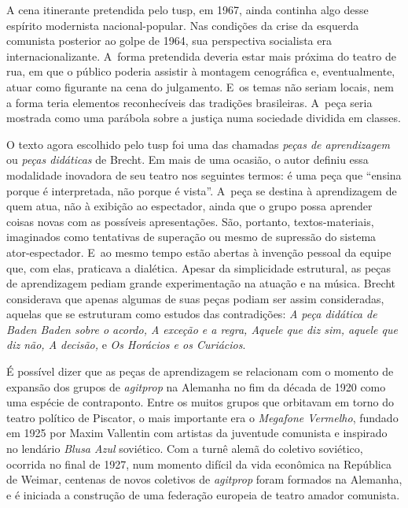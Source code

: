 
A cena itinerante pretendida pelo {\sc tusp}, em 1967, ainda continha algo
desse espírito modernista nacional-popular. Nas condições da crise da
esquerda comunista posterior ao golpe de 1964, sua perspectiva
socialista era internacionalizante. A~forma pretendida deveria estar
mais próxima do teatro de rua, em que o público poderia assistir à
montagem cenográfica e, eventualmente, atuar como figurante na cena do
julgamento. E~os temas não seriam locais, nem a forma teria elementos
reconhecíveis das tradições brasileiras. A~peça seria mostrada como uma
parábola sobre a justiça numa sociedade dividida em classes.

\subject{Estudo de formas cênico-dramatúrgicas: aprendizagem e agitprop}

O texto agora escolhido pelo {\sc tusp} foi uma das chamadas {\it peças de
aprendizagem} ou {\it peças didáticas} de Brecht. Em mais de uma
ocasião, o autor definiu essa modalidade inovadora de seu teatro nos
seguintes termos: é uma peça que “ensina porque é interpretada, não
porque é vista”. A~peça se destina à aprendizagem de quem atua, não à
exibição ao espectador, ainda que o grupo possa aprender coisas novas
com as possíveis apresentações. São, portanto, textos-materiais,
imaginados como tentativas de superação ou mesmo de supressão do sistema
ator-espectador. E~ao mesmo tempo estão abertas à invenção pessoal da
equipe que, com elas, praticava a dialética. Apesar da
simplicidade estrutural, as peças de aprendizagem pediam grande
experimentação na atuação e na música. Brecht considerava que apenas
algumas de suas peças podiam ser assim consideradas, aquelas que se
estruturam como estudos das contradições: {\it A peça didática de Baden
Baden sobre o acordo, A exceção e a regra, Aquele que diz sim, aquele
que diz não, A decisão,} e {\it Os Horácios e os Curiácios}.

É possível dizer que as peças de aprendizagem se relacionam com o
momento de expansão dos grupos de {\it agitprop} na Alemanha no fim da
década de 1920 como uma espécie de contraponto. Entre os muitos grupos
que orbitavam em torno do teatro político de Piscator, o
mais importante era o {\it Megafone Vermelho}, fundado em 1925 por
Maxim Vallentin com artistas da juventude comunista e inspirado no
lendário {\it Blusa Azul} soviético. Com a turnê alemã do coletivo
soviético, ocorrida no final de 1927, num momento difícil da vida
econômica na República de Weimar, centenas de novos coletivos de
{\it agitprop} foram formados na Alemanha, e é iniciada a construção de
uma federação europeia de teatro amador comunista.


